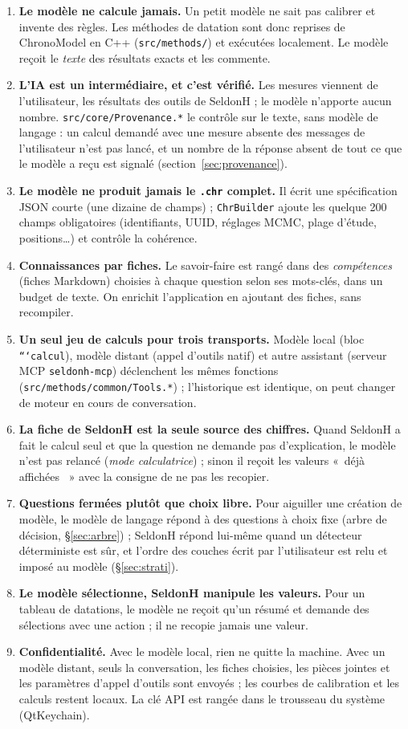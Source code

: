 \documentclass[11pt,a4paper]{article}
\providecommand{\og}{«~}\providecommand{\fg}{\unskip~»}
\newcommand{\code}[1]{\texttt{\small #1}}
\begin{document}
\begin{enumerate}[leftmargin=*]
\item \textbf{Le modèle ne calcule jamais.} Un petit modèle ne sait pas calibrer et invente des règles. Les méthodes de
  datation sont donc reprises de ChronoModel en C++ (\code{src/methods/}) et exécutées localement. Le modèle reçoit le
  \emph{texte} des résultats exacts et les commente.
\item \textbf{L'IA est un intermédiaire, et c'est vérifié.} Les mesures viennent de l'utilisateur, les résultats des
  outils de SeldonH ; le modèle n'apporte aucun nombre. \code{src/core/Provenance.*} le contrôle sur le texte, sans
  modèle de langage : un calcul demandé avec une mesure absente des messages de l'utilisateur n'est pas lancé, et un
  nombre de la réponse absent de tout ce que le modèle a reçu est signalé (section~\ref{sec:provenance}).
\item \textbf{Le modèle ne produit jamais le \code{.chr} complet.} Il écrit une spécification JSON courte (une dizaine
  de champs) ; \code{ChrBuilder} ajoute les quelque 200 champs obligatoires (identifiants, UUID, réglages MCMC, plage
  d'étude, positions\dots) et contrôle la cohérence.
\item \textbf{Connaissances par fiches.} Le savoir-faire est rangé dans des \emph{compétences} (fiches Markdown) choisies
  à chaque question selon ses mots-clés, dans un budget de texte. On enrichit l'application en ajoutant des fiches,
  sans recompiler.
\item \textbf{Un seul jeu de calculs pour trois transports.} Modèle local (bloc \code{```calcul}), modèle distant
  (appel d'outils natif) et autre assistant (serveur MCP \code{seldonh-mcp}) déclenchent les mêmes fonctions
  (\code{src/methods/common/Tools.*}) ; l'historique est identique, on peut changer de moteur en cours de conversation.
\item \textbf{La fiche de SeldonH est la seule source des chiffres.} Quand SeldonH a fait le calcul seul et que la
  question ne demande pas d'explication, le modèle n'est pas relancé (\emph{mode calculatrice}) ; sinon il reçoit les
  valeurs \og déjà affichées \fg{} avec la consigne de ne pas les recopier.
\item \textbf{Questions fermées plutôt que choix libre.} Pour aiguiller une création de modèle, le modèle de langage
  répond à des questions à choix fixe (arbre de décision, §\ref{sec:arbre}) ; SeldonH répond lui-même quand un
  détecteur déterministe est sûr, et l'ordre des couches écrit par l'utilisateur est relu et imposé au modèle
  (§\ref{sec:strati}).
\item \textbf{Le modèle sélectionne, SeldonH manipule les valeurs.} Pour un tableau de datations, le modèle ne reçoit
  qu'un résumé et demande des sélections avec une action ; il ne recopie jamais une valeur.
\item \textbf{Confidentialité.} Avec le modèle local, rien ne quitte la machine. Avec un modèle distant, seuls la
  conversation, les fiches choisies, les pièces jointes et les paramètres d'appel d'outils sont envoyés ; les courbes
  de calibration et les calculs restent locaux. La clé API est rangée dans le trousseau du système (QtKeychain).
\end{enumerate}
\end{document}

